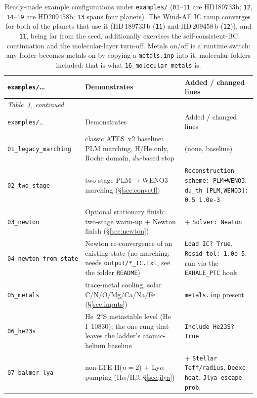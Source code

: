 \documentclass[english,a4paper]{my_memo}
\begin{document}
{\small
\begin{longtable}{@{}lp{4.6cm}p{5.6cm}@{}}
\caption{Ready-made example configurations under \texttt{examples/}
(\texttt{01}--\texttt{11} are HD189733b; \texttt{12}, \texttt{14}--\texttt{19}
are HD209458b; \texttt{13} spans four planets). The Wind-AE IC ramp converges
for both of the planets that use it (HD\,189733\,b (\texttt{11}) and
HD\,209458\,b (\texttt{12})), and \texttt{11}, being far from the seed,
additionally exercises the self-consistent-BC continuation and the
molecular-layer turn-off. Metals on/off is a runtime switch: any folder
becomes metals-on by copying a \texttt{metals.inp} into it, molecular folders
included: that is what \texttt{16\_molecular\_metals} is.}
\label{tab:exinputs}\\
\toprule
\texttt{examples/}\ldots & Demonstrates & Added / changed lines \\
\midrule
\endfirsthead
\multicolumn{3}{l}{\small\itshape Table~\ref{tab:exinputs}, continued}\\
\toprule
\texttt{examples/}\ldots & Demonstrates & Added / changed lines \\
\midrule
\endhead
\bottomrule
\endfoot
\texttt{01\_legacy\_marching} & classic ATES~v2 baseline: PLM marching,
  H/He only, Roche domain, $du$-based stop & (none, baseline) \\
\texttt{02\_two\_stage} & two-stage PLM$\to$WENO3 marching
  (\S\ref{sec:convctl}) & \texttt{Reconstruction scheme: PLM+WENO3},
  \texttt{du\_th [PLM,WENO3]: 0.5 1.0e-3} \\
\texttt{03\_newton} & Optional stationary finish: two-stage warm-up $+$
  Newton finish (\S\ref{sec:newton}) & $+$ \texttt{Solver: Newton} \\
\texttt{04\_newton\_from\_state} & Newton re-convergence of an existing state
  (no marching; needs \texttt{output/*\_IC.txt}, see the folder
  \texttt{README}) & \texttt{Load IC? True},
  \texttt{Resid tol: 1.0e-5}; run via the \texttt{EXHALE\_PTC} hook \\
\texttt{05\_metals} & trace-metal cooling, solar C/N/O/Mg/Ca/Na/Fe
  (\S\ref{sec:inputs}) & \texttt{metals.inp} present \\
\texttt{06\_he23s} & He~$2^3$S metastable level (He\,I~10830); the one rung
  that leaves the ladder's atomic-helium baseline &
  \texttt{Include He23S? True} \\
\texttt{07\_balmer\_lya} & non-LTE H($n{=}2$) $+$ Ly$\alpha$ pumping
  (H$\alpha$/H$\beta$, \S\ref{sec:jlya}) & $+$ \texttt{Stellar
  Teff/radius}, \texttt{Deexc heat}, \texttt{Jlya escape-prob},

\end{longtable}}
\end{document}
